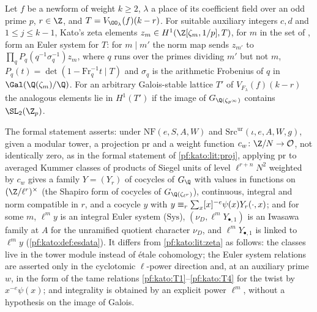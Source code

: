 \begin{littheorem}\label{pf:kato:lit:zeta}
Let $f$ be a newform of weight $k\ge2$, $\lambda$ a place of its coefficient field over an odd prime $p$, $r\in\Z$, and $T=V_{\OO_\lambda}(f)(k-r)$.
For suitable auxiliary integers $c,d$ and $1\le j\le k-1$, Kato's zeta elements $z_m\in H^1(\Z[\zeta_m,1/p],T)$, for $m$ in the set of
\cite[13.3]{Kato2004}, form an Euler system for $T$: for $m\mid m'$ the norm map sends $z_{m'}$ to $\prod_q P_q(q^{-1}\sigma_q^{-1})z_m$, where
$q$ runs over the primes dividing $m'$ but not $m$, $P_q(t)=\det(1-\mathrm{Fr}_q^{-1}t\mid T)$ and $\sigma_q$ is the arithmetic Frobenius of $q$ in
$\Gal(\Q(\zeta_m)/\Q)$. For an arbitrary Galois-stable lattice $T'$ of $V_{F_\lambda}(f)(k-r)$ the analogous elements lie in $H^1(T')$ if the image
of $G_{\Q(\zeta_{p^\infty})}$ contains $\SL_2(\Z_p)$.
\end{littheorem}

\begin{remark}\label{pf:kato:rem:zeta}
The formal statement asserts: under $\mathrm{NF}(e,S,A,W)$ and $\mathrm{Src}^{\mathrm{ur}}(\iota,e,A,W,g)$, given a modular tower, a
projection $\mathrm{pr}$ and a weight function $c_w\colon\Z/N\to\katoO$, not identically zero, as in the formal statement of
\cref{pf:kato:lit:proj}, applying $\mathrm{pr}$ to averaged Kummer classes of products of Siegel units of level $\ell^{r+n}N^2$
\cite{KubertLang1981} weighted by $c_w$ gives a family $Y=(Y_r)$ of cocycles of $G_\Q$ with values in functions on $(\Z/\ell^r)^\times$ (the
Shapiro form of cocycles of $G_{\Q(\zeta_{\ell^r})}$), continuous, integral and norm compatible in $r$, and a cocycle $y$ with
$y\equiv_{r}\sum_x[x]^{-e}\psi(x)Y_r(\cdot,x)$; and for some $m$, $\ell^my$ is an integral Euler system ($\mathrm{Sys}$),
$(\nu_D,\ell^mY_{\bullet,1})$ is an Iwasawa family at $A$ for the unramified quotient character $\nu_D$, and $\ell^mY_{\bullet,1}$ is linked to
$\ell^my$ (\cref{pf:kato:def:esdata}). It differs from \cref{pf:kato:lit:zeta} as follows: the classes live in the tower module instead of
\'etale cohomology; the Euler system relations are asserted only in the cyclotomic $\ell$-power direction and, at an auxiliary prime $w$,
in the form of the tame relations \ref{pf:kato:T1}--\ref{pf:kato:T4} for the twist by $x^{-e}\psi(x)$; and integrality is obtained by an
explicit power $\ell^m$, without a hypothesis on the image of Galois.
\end{remark}

